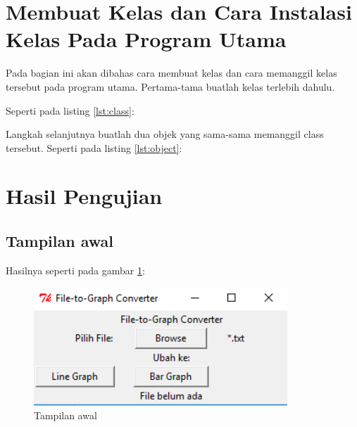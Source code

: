 \section{Membuat Kelas dan Cara Instalasi Kelas Pada Program Utama}
Pada bagian ini akan dibahas cara membuat kelas dan cara memanggil kelas tersebut pada program utama. Pertama-tama buatlah kelas terlebih dahulu.

Seperti pada listing \ref{lst:class}:

	
Langkah selanjutnya buatlah dua objek yang sama-sama memanggil class tersebut.
Seperti pada listing \ref{lst:object}:


\section{Hasil Pengujian}
\subsection{Tampilan awal}
Hasilnya seperti pada gambar \ref{fig:tampilanawal}:
\begin{figure}[!htbp]
	\centerline{\includegraphics[width=0.85\textwidth]{figures/3/tampilanawal.PNG}}
	\caption{Tampilan awal}
	\label{fig:tampilanawal}
\end{figure}

